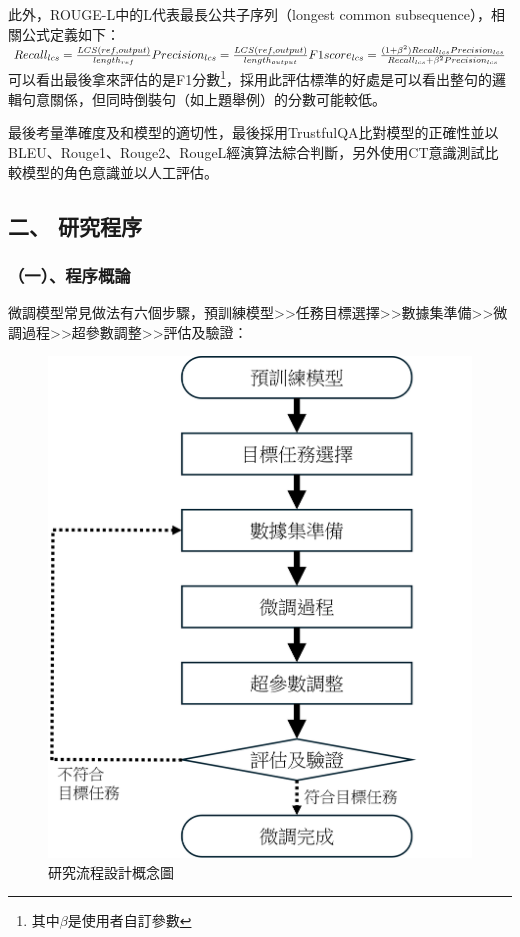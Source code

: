 \documentclass[12pt,a4paper,MingLiU,UTF8,natbib]{article}
\begin{document}
\begin{minipage}{.9\textwidth}
		此外，ROUGE-L中的L代表最長公共子序列（longest common subsequence），相關公式定義如下：
		\newline
		$
			Recall_{lcs}=\frac{LCS(ref,output)}{length_{ref}}
			\newline
			Precision_{lcs}=\frac{LCS(ref,output)}{length_{output}}
			\newline
			F1score_{lcs}=\frac{(1+\beta^2)Recall_{lcs}Precision_{lcs}}{Recall_{lcs}+\beta^2Precision_{lcs}}
		$
		\newline
		可以看出最後拿來評估的是F1分數\footnote{其中$\beta$是使用者自訂參數}\cite{lin-2004-rouge}，採用此評估標準的好處是可以看出整句的邏輯句意關係，但同時倒裝句（如上題舉例）的分數可能較低。
	\end{minipage}%

	最後考量準確度及和模型的適切性，最後採用TrustfulQA比對模型的正確性並以BLEU、Rouge1、Rouge2、RougeL經演算法綜合判斷，另外使用CT意識測試比較模型的角色意識並以人工評估。
	\subsection{二、 研究程序}
	\subsubsection{（一）、程序概論}
	微調模型常見做法有六個步驟，預訓練模型>>任務目標選擇>>數據集準備>>微調過程>>超參數調整>>評估及驗證：
	
	\begin{figure}[H]
		\centering
		\includegraphics[scale=0.9]{flowcahrt}
		\caption{研究流程設計概念圖}
	\end{figure}
	
\end{document}

